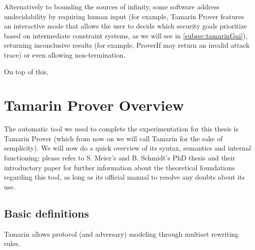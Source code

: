 \documentclass[fleqn,10pt]{SelfArx} %
\newcounter{definition}[section]\setcounter{definition}{0}
\begin{document}
Alternatively to bounding the sources of infinity, some software address undecidability by requiring human input (for example, Tamarin Prover \cite{tamarinIntroduction} features an interactive mode that allows the user to decide which security goals prioritize based on intermediate constraint systems, as we will see in \ref{subsec:tamarinGui}), returning inconclusive results (for example, ProverIf \cite{proverifIntroduction} may return an invalid attack trace) or even allowing non-termination.

On top of this, 

\section{Tamarin Prover Overview}\label{sec:TamarinOverview}

The automatic tool we used to complete the experimentation for this thesis is Tamarin Prover (which from now on we will call Tamarin for the sake of semplicity). We will now do a quick overview of its syntax, semantics and internal functioning; please refer to S. Meier's \cite{meierThesis} and B. Schmidt's \cite{schmidtThesis} PhD thesis and their introductory paper \cite{TamarinFoundations} for further information about the theoretical foundations regarding this tool, as long as its official manual \cite{tamarinManual} to resolve any doubts about its use.

\subsection{Basic definitions}

Tamarin allows protocol (and adversary) modeling through multiset rewriting rules.
\end{document}
